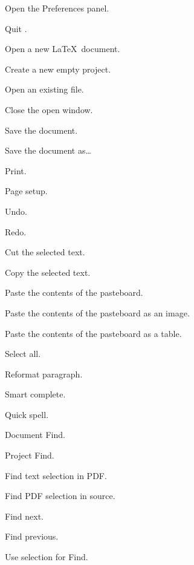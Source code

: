 \begin{description}
	\item[\keys{\cmdkey + {,}}] Open the Preferences panel.
	\item[] Quit \texnicle.
	\item[] Open a new \LaTeX\ document.
	\item[] Create a new empty project.
	\item[] Open an existing file.
	\item[] Close the open window.
	\item[] Save the document.
	\item[] Save the document as\ldots
	\item[] Print.
	\item[] Page setup.
	\item[] Undo.	
	\item[] Redo.
	\item[] Cut the selected text.
	\item[] Copy the selected text.
	\item[] Paste the contents of the pasteboard.
	\item[] Paste the contents of the pasteboard as an image.
	\item[] Paste the contents of the pasteboard as a table.
	\item[] Select all.
	\item[] Reformat paragraph.
	\item[\keys{\esckey}] Smart complete.
	\item[] Quick spell.
	\item[] Document Find.
	\item[] Project Find.
	\item[] Find text selection in PDF{.}
	\item[] Find PDF selection in source.
	\item[] Find next.
	\item[] Find previous.
	\item[] Use selection for Find.

\end{description}
